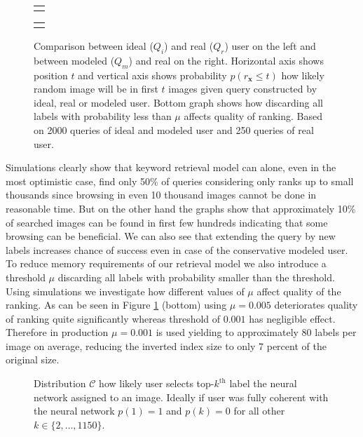 \begin{figure}
	\centering
	
	\begin{tabular}{@{}c@{}}
		\subfloat{
			
		}
	\end{tabular}
	\begin{tabular}{@{}c@{}}
		\subfloat{
			
		}
	\end{tabular}
	
	
	\caption[Comparison between ideal, real and modeled user]{Comparison between ideal ($Q_i$) and real ($Q_r$) user on the left and between modeled ($Q_m$) and real on the right. Horizontal axis shows position $t$ and vertical axis shows probability $p(r_{\bm{x}}\leq t)$ how likely random image will be in first $t$ images given query constructed by ideal, real or modeled user. Bottom graph shows how discarding all labels with probability less than $\mu$ affects quality of ranking. Based on 2000 queries of ideal and modeled user and 250 queries of real user.}
	\label{fig:simulation_keyword}
\end{figure}
Simulations clearly show that keyword retrieval model can alone, even in the most optimistic case, find only 50\% of queries considering only ranks up to small thousands since browsing in even 10 thousand images cannot be done in reasonable time. But on the other hand the graphs show that approximately 10\% of searched images can be found in first few hundreds indicating that some browsing can be beneficial. We can also see that extending the query by new labels increases chance of success even in case of the conservative modeled user.
To reduce memory requirements of our retrieval model we also introduce a threshold $\mu$ discarding all labels with probability smaller than the threshold. Using simulations we investigate how different values of $\mu$ affect quality of the ranking. As can be seen in Figure \ref{fig:simulation_keyword} (bottom) using $\mu=0.005$ deteriorates quality of ranking quite significantly whereas threshold of $0.001$ has negligible effect. Therefore in production $\mu = 0.001$ is used yielding to approximately 80 labels per image on average, reducing the inverted index size to only 7 percent of the original size.

\begin{figure}
	\centering
	
	
	\caption[Agreement between user and neural network labeling]{Distribution $\mathcal{C}$ how likely user selects top-$k^{\mathrm{th}}$ label the neural network assigned to an image. Ideally if user was fully coherent with the neural network $p(1)=1$ and $p(k)=0$ for all other $k\in\{2,\dots,1150\}$.
	}
	\label{fig:class_distribution}
\end{figure}


